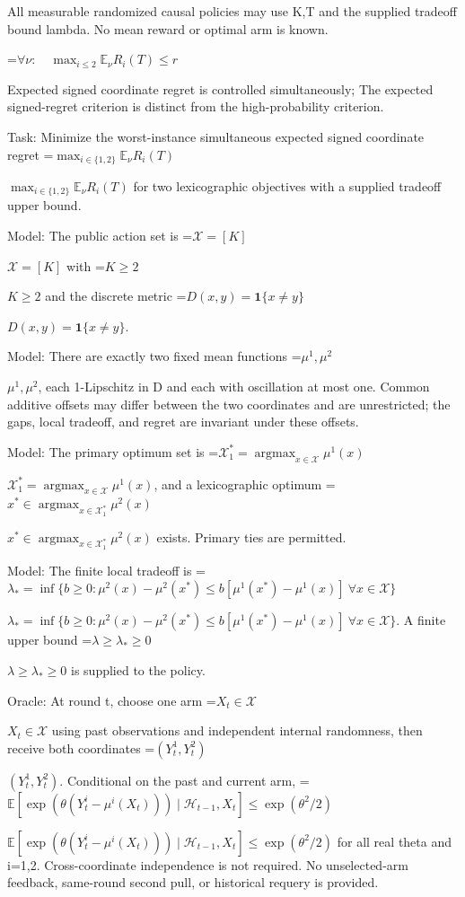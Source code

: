 \documentclass[10pt,a4paper]{article}
\newcommand{\AtlasMath}[1]{\par\begingroup\centering\setbox0=\hbox{$\displaystyle #1$}\ifdim\wd0>1.4\linewidth\typeout{ATLAS WIDE FORMULA: \the\wd0}\fi\ifdim\wd0>\linewidth\resizebox{\linewidth}{!}{\box0}\else\box0\fi\par\endgroup}
\newcommand{\AtlasInlineMath}[1]{\begingroup\setbox0=\hbox{$#1$}\ifdim\wd0>.4\linewidth\endgroup\AtlasMath{#1}\else\endgroup$#1$\fi}
\begin{document}
All measurable randomized causal policies may use K,T and the supplied tradeoff bound lambda. No mean reward or optimal arm is known.




\AtlasMath{\forall\nu:\quad\max_{i\le2}\mathbb E_\nu R_i(T)\le r}




Expected signed coordinate regret is controlled simultaneously; The expected signed-regret criterion is distinct from the high-probability criterion.



Task: Minimize the worst-instance simultaneous expected signed coordinate regret \AtlasInlineMath{\max_{i\in\{1,2\}}\mathbb E_\nu R_i(T)} for two lexicographic objectives with a supplied tradeoff upper bound.



Model: The public action set is \AtlasInlineMath{\mathcal X=[K]} with \AtlasInlineMath{K\ge2} and the discrete metric \AtlasInlineMath{D(x,y)=\mathbf1\{x\ne y\}}.



Model: There are exactly two fixed mean functions \AtlasInlineMath{\mu^1,\mu^2}, each 1-Lipschitz in D and each with oscillation at most one. Common additive offsets may differ between the two coordinates and are unrestricted; the gaps, local tradeoff, and regret are invariant under these offsets.



Model: The primary optimum set is \AtlasInlineMath{\mathcal X_1^*=\operatorname{argmax}_{x\in\mathcal X}\mu^1(x)}, and a lexicographic optimum \AtlasInlineMath{x^*\in\operatorname{argmax}_{x\in\mathcal X_1^*}\mu^2(x)} exists. Primary ties are permitted.



Model: The finite local tradeoff is \AtlasInlineMath{\lambda_*=\inf\{b\ge0:\mu^2(x)-\mu^2(x^*)\le b[\mu^1(x^*)-\mu^1(x)]\ \forall x\in\mathcal X\}}. A finite upper bound \AtlasInlineMath{\lambda\ge\lambda_*\ge0} is supplied to the policy.



Oracle: At round t, choose one arm \AtlasInlineMath{X_t\in\mathcal X} using past observations and independent internal randomness, then receive both coordinates \AtlasInlineMath{(Y_t^1,Y_t^2)}. Conditional on the past and current arm, \AtlasInlineMath{\mathbb E[\exp(\theta(Y_t^i-\mu^i(X_t)))\mid\mathcal H_{t-1},X_t]\le\exp(\theta^2/2)} for all real theta and i=1,2. Cross-coordinate independence is not required. No unselected-arm feedback, same-round second pull, or historical requery is provided.
\end{document}
